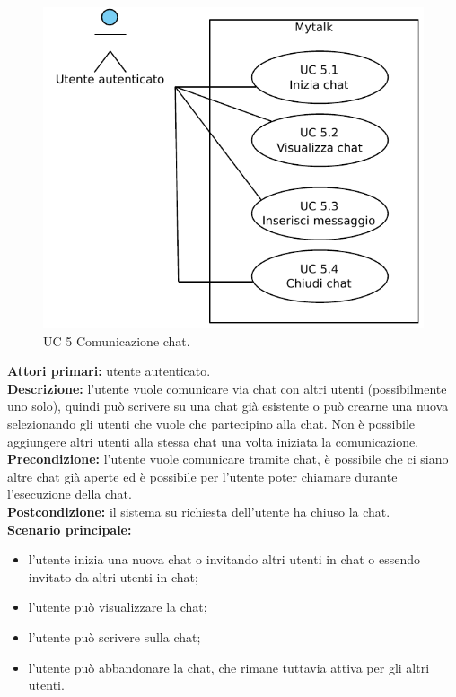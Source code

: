 \begin{figure}[htbp]
\centering
\includegraphics[scale=0.7]{./casi_uso/UC5.pdf}
\caption{UC 5 Comunicazione chat.}
\end{figure}

\noindent
\textbf{Attori primari:} utente autenticato.\\
\textbf{Descrizione:} l'utente vuole comunicare via chat con altri utenti (possibilmente uno solo), quindi può scrivere su una chat già esistente o può crearne una nuova selezionando gli utenti che vuole che partecipino alla chat. Non è possibile aggiungere altri utenti alla stessa chat una volta iniziata la comunicazione.\\
\textbf{Precondizione:} l'utente vuole comunicare tramite chat, è possibile che ci siano altre chat già aperte ed è possibile per l'utente poter chiamare durante l'esecuzione della chat.\\
\textbf{Postcondizione:} il sistema su richiesta dell'utente ha chiuso la chat.\\
\textbf{Scenario principale:}
\begin{itemize}
\item l'utente inizia una nuova chat o invitando altri utenti in chat o essendo invitato da altri utenti in chat;
\item l'utente può visualizzare la chat;
\item l'utente può scrivere sulla chat;
\item l'utente può abbandonare la chat, che rimane tuttavia attiva per gli altri utenti.
\end{itemize}

